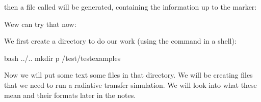 \documentclass[letterpaper,10pt,english]{sphinxmanual}
\begin{document}
then a file called  will be generated, containing the information up to the  marker:

\begin{sphinxVerbatim}[commandchars=\\\{\}]
   
   
\end{sphinxVerbatim}

Wew can try that now:

We first create a directory to do our work (using the  command  in a  shell):

{
\begin{sphinxVerbatim}[commandchars=\\\{\}]
\llap{\color{nbsphinxin}[18]:\,\hspace{\fboxrule}\hspace{\fboxsep}}\PYGZpc{}\PYGZpc{}bash
 ../..
mkdir \PYGZhy{}p /test/test\PYGZus{}examples
\end{sphinxVerbatim}
}

Now we will put some text some files in that directory. We will be creating files that we need to run a radiative transfer simulation. We will look into what these mean and their formats later in the notes.
\end{document}
